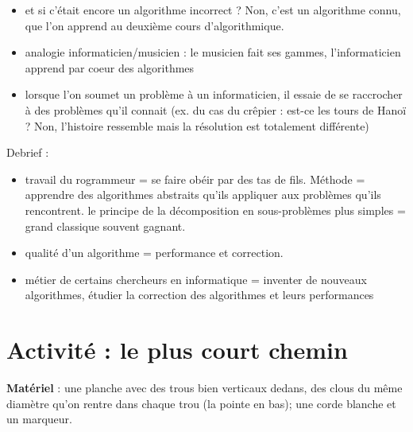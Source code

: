 \documentclass{article}
\newcommand{\titre}[1]{\medskip\noindent\textbf{#1} : }
\newcommand{\materiel}{\titre{Matériel}}
\begin{document}
\begin{itemize}
\begin{itemize}
\begin{itemize}
\item et si c'était encore un algorithme incorrect ? Non, c'est un algorithme connu, que l'on apprend au deuxième cours d'algorithmique.
\item analogie informaticien/musicien : le musicien fait ses gammes, l'informaticien apprend par coeur des algorithmes
\item lorsque l'on soumet un problème à un informaticien, il essaie de se raccrocher à des problèmes qu'il connait (ex. du cas du crêpier : est-ce les tours de Hanoï ? Non, l'histoire ressemble mais la résolution est totalement différente)
\end{itemize}
\end{itemize}
\end{itemize}

Debrief :
\begin{itemize}
\item travail du rogrammeur = se faire obéir par des tas de fils. Méthode = apprendre des algorithmes abstraits qu'ils appliquer aux problèmes qu'ils rencontrent. le principe de la décomposition en sous-problèmes plus simples = grand classique souvent gagnant.
\item qualité d'un algorithme = performance et correction.
\item métier de certains chercheurs en informatique = inventer de nouveaux algorithmes, étudier la correction des algorithmes et leurs performances
\end{itemize}



\section{Activité : le plus court chemin}

\materiel une planche avec des trous bien verticaux dedans, des clous du
même diamètre qu'on rentre dans chaque trou (la pointe en bas); une corde
blanche et un marqueur.
\end{document}
